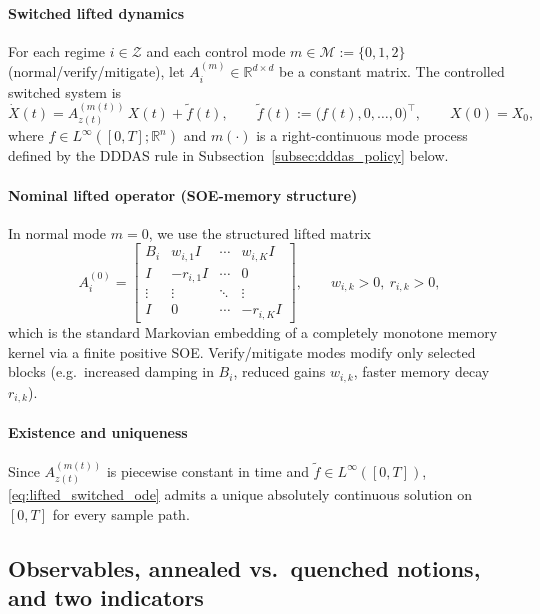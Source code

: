 \documentclass[12pt,a4paper]{article}
\theoremstyle{definition}
\theoremstyle{remark}
\begin{document}
\paragraph{Switched lifted dynamics}
For each regime $i\in\mathcal{Z}$ and each control mode $m\in\mathcal{M}:=\{0,1,2\}$ (normal/verify/mitigate),
let $A_i^{(m)}\in\mathbb{R}^{d\times d}$ be a constant matrix. The controlled switched system is
\begin{equation}\label{eq:lifted_switched_ode}
	\dot{X}(t)=A_{z(t)}^{(m(t))}\,X(t)+\widetilde f(t),
	\qquad
	\widetilde f(t):=\big(f(t),0,\dots,0\big)^\top,
	\qquad X(0)=X_0,
\end{equation}
where $f\in L^\infty([0,T];\mathbb{R}^n)$ and $m(\cdot)$ is a right-continuous mode process defined by the DDDAS rule in
Subsection~\ref{subsec:dddas_policy} below.

\paragraph{Nominal lifted operator (SOE-memory structure)}
In normal mode $m=0$, we use the structured lifted matrix
\begin{equation}\label{eq:lifted_structure_nominal}
	A_i^{(0)}=
	\begin{bmatrix}
		B_i & w_{i,1}I & \cdots & w_{i,K}I\\
		I & -r_{i,1}I & \cdots & 0\\
		\vdots & \vdots & \ddots & \vdots\\
		I & 0 & \cdots & -r_{i,K}I
	\end{bmatrix},
	\qquad w_{i,k}>0,\ r_{i,k}>0,
\end{equation}
which is the standard Markovian embedding of a completely monotone memory kernel via a finite positive SOE.
Verify/mitigate modes modify only selected blocks (e.g.\ increased damping in $B_i$, reduced gains $w_{i,k}$, faster memory decay $r_{i,k}$).

\paragraph{Existence and uniqueness}
Since $A_{z(t)}^{(m(t))}$ is piecewise constant in time and $\widetilde f\in L^\infty([0,T])$,
\eqref{eq:lifted_switched_ode} admits a unique absolutely continuous solution on $[0,T]$ for every sample path.

\subsection{Observables, annealed vs.\ quenched notions, and two indicators}
\label{subsec:observables_indicators}
\end{document}

